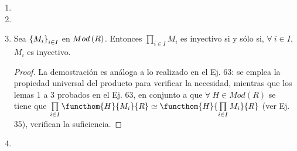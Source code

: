 \documentclass{article}
\begin{document}
\begin{enumerate}[label=\textbf{Ej \arabic*.}]
\begin{proof}
			\begin{center}
			\end{center} es una sucesión exacta en $Mod\lrprth{\mathbb{Z}}$ y así, por el Lema 1,
			\begin{center}
			\end{center}
			es una sucesión exacta. Se tiene que
			\begin{align*}
				\prod\limits_{i\in I}F_i\lrprth{X}&=\prod\limits_{i\in I}\functhom{M_i}{X}{R}\\ &\simeq\functhom{\coprod\limits_{i\in I}M_i}{X}{R}.  && \text{Ej. 32}
				\intertext{Similarmente se encuentra que}
				\prod\limits_{i\in I}F_i\lrprth{Y} &\simeq\functhom{\coprod\limits_{i\in I}M_i}{Y}{R},\\
				\prod\limits_{i\in I}F_i\lrprth{Z} &\simeq\functhom{\coprod\limits_{i\in I}M_i}{Z}{R}.
			\end{align*}
			Con lo cual, por el Lema 2, 
			\begin{center}
			\end{center}
			es una sucesión exacta y así $\coprod\limits_{i\in I} M_i$ es un módulo proyectivo. Finalmente como $C\simeq\coprod\limits_{i\in I}M_i$ en $Mod(R)$, por el Lema 3, se sigue que $C$ es proyectivo y así se tiene lo deseado.\\
		\end{proof}
		\item 
		\item
		\item Sea ${\left\{{M}_{i}\right\}}_{i\in I}$ en $Mod\left(R\right)$. Entonces $\prod\limits_{i\in I}M_i$ es inyectivo si y sólo si, $\forall\ i\in I$, $M_i$  es inyectivo.
		\begin{proof}
			La demostración es análoga a lo realizado en el Ej. 63: se emplea la propiedad universal del producto para verificar la necesidad, mientras que los lemas 1 a 3 probados en el Ej. 63, en conjunto a que $\forall\ H\in Mod(R)$ se tiene que $\prod\limits_{i\in I}\functhom{H}{M_i}{R}\simeq\functhom{H}{\prod\limits_{i\in I}M_i}{R}$ (ver Ej. 35), verifican la suficiencia.
		\end{proof}
		\item 
	\end{enumerate}
\end{document}
